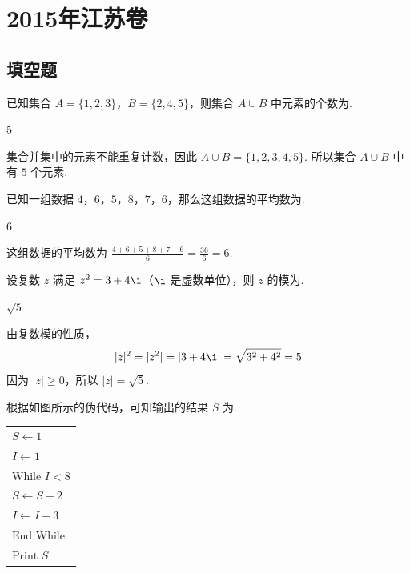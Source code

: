 \chapter{2015年江苏卷}

\section{填空题}

\begin{problem}
已知集合 \(A = \{1, 2, 3\}\)，\(B = \{2, 4, 5\}\)，则集合 \(A \cup B\) 中元素的个数为\fillinblank{}.
\end{problem}

\begin{answer}
5
\end{answer}

\begin{solution}
集合并集中的元素不能重复计数，因此 \(A\cup B=\{1,2,3,4,5\}\).
所以集合 \(A\cup B\) 中有 \(5\) 个元素.
\end{solution}

\begin{problem}
已知一组数据 \(4\)，\(6\)，\(5\)，\(8\)，\(7\)，\(6\)，那么这组数据的平均数为\fillinblank{}.
\end{problem}

\begin{answer}
6
\end{answer}

\begin{solution}
这组数据的平均数为 \(\frac{4+6+5+8+7+6}{6}=\frac{36}{6}=6\).
\end{solution}

\begin{problem}
设复数 \(z\) 满足 \(z^{2}=3+4\i\)（\(\i\) 是虚数单位），则 \(z\) 的模为\fillinblank{}.
\end{problem}

\begin{answer}
\(\sqrt{5}\)
\end{answer}

\begin{solution}
由复数模的性质，
\[
|z|^{2}=|z^{2}|=|3+4\i|=\sqrt{3^{2}+4^{2}}=5
\]
因为 \(|z|\geqslant0\)，所以 \(|z|=\sqrt{5}\).
\end{solution}

\begin{problem}
根据如图所示的伪代码，可知输出的结果 \(S\) 为\fillinblank{}.

\begin{center}
\begin{tabular}{l}
\(S \leftarrow 1\) \\
\(I \leftarrow 1\) \\
\(\text{While } I<8\) \\
\(S \leftarrow S+2\) \\
\(I \leftarrow I+3\) \\
\(\text{End While}\) \\
\(\text{Print } S\)
\end{tabular}
\end{center}
\end{problem}

